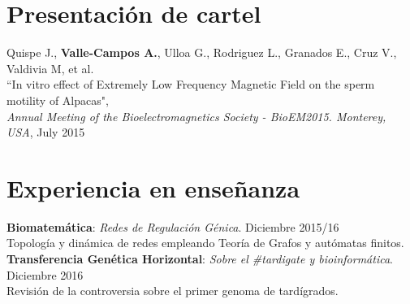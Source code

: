 \documentclass[margin,line]{res}
\begin{document}
\begin{resume}
		
		
		\section{\sc Presentación de cartel}
		
		Quispe J., \textbf{Valle-Campos A.}, Ulloa G., Rodriguez L., Granados E., Cruz V., Valdivia M, et al.\\ ``In vitro effect of Extremely Low Frequency Magnetic Field on the sperm motility of Alpacas", \\ {\em Annual Meeting of the Bioelectromagnetics Society - BioEM2015. Monterey, USA}, July 2015\\
		
		
		
		
		\section{\sc Experiencia en enseñanza}
		{\bf Biomatemática}: {\em Redes de Regulación Génica}. \hfill {Diciembre 2015/16}\\ Topología y dinámica de redes empleando Teoría de Grafos y autómatas finitos. \\[4pt] 
		{\bf Transferencia Genética Horizontal}: {\em Sobre el \#tardigate y bioinformática}. \hfill {Diciembre 2016}\\ Revisión de la controversia sobre el primer genoma de tardígrados.\\
		

\end{resume}
\end{document}
